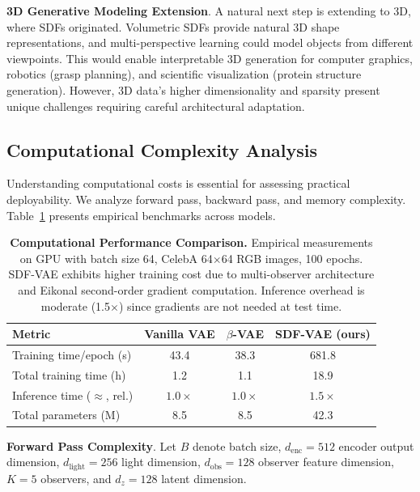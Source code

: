 \documentclass[10pt,twocolumn,letterpaper]{article}
\newcommand{\toprule}{\hline\hline}
\newcommand{\midrule}{\hline}
\newcommand{\bottomrule}{\hline\hline}
\begin{document}
\textbf{3D Generative Modeling Extension}. A natural next step is extending to 3D, where SDFs originated. Volumetric SDFs provide natural 3D shape representations, and multi-perspective learning could model objects from different viewpoints. This would enable interpretable 3D generation for computer graphics, robotics (grasp planning), and scientific visualization (protein structure generation). However, 3D data's higher dimensionality and sparsity present unique challenges requiring careful architectural adaptation.

\subsection{Computational Complexity Analysis}

Understanding computational costs is essential for assessing practical deployability. We analyze forward pass, backward pass, and memory complexity. Table~\ref{tab:computational_performance} presents empirical benchmarks across models.

\begin{table}[htbp]
\centering
\caption{\textbf{Computational Performance Comparison.} Empirical measurements on GPU with batch size 64, CelebA 64$\times$64 RGB images, 100 epochs. SDF-VAE exhibits higher training cost due to multi-observer architecture and Eikonal second-order gradient computation. Inference overhead is moderate (1.5$\times$) since gradients are not needed at test time.}
\label{tab:computational_performance}
\footnotesize
\begin{tabular}{lccc}
\toprule
\textbf{Metric} & \textbf{Vanilla VAE} & \textbf{$\beta$-VAE} & \textbf{SDF-VAE (ours)} \\
\midrule
Training time/epoch (s) & 43.4 & 38.3 & 681.8 \\
Total training time (h) & 1.2 & 1.1 & 18.9 \\
Inference time ($\approx$, rel.) & $1.0\times$ & $1.0\times$ & $1.5\times$ \\
Total parameters (M) & 8.5 & 8.5 & 42.3 \\
\bottomrule
\end{tabular}
\end{table}

\textbf{Forward Pass Complexity}. Let $B$ denote batch size, $d_{\text{enc}}=512$ encoder output dimension, $d_{\text{light}}=256$ light dimension, $d_{\text{obs}}=128$ observer feature dimension, $K=5$ observers, and $d_z=128$ latent dimension.
\end{document}
